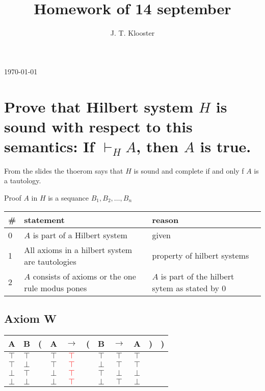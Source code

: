 \documentclass{article}
\begin{document}
\author{J. T. Klooster}
\title{Homework of 14 september}
\maketitle
\today
\section{Prove that Hilbert system $H$ is sound with respect to this
semantics: If $\vdash_H A$, then $A$ is true.}

From the slides the thoerom says that $H$ is sound and complete
if and only f $A$ is a tautology.

Proof $A$ in $H$ is a sequance $B_1, B_2, \ldots, B_n$

\begin{tabular}{@{}l|ll@{}}
\#& statement			&reason \\ \toprule
0& $A$ is part of a Hilbert system & given \\
1& All axioms in a hilbert system are tautologies & property of hilbert systems\\
2& $A$ consists of axioms or the one rule modus pones & $A$ is part of the hilbert sytem as stated by $0$ \\
\end{tabular}


\subsection{Axiom W}
\begin{tabular}{@{ }c@{ }@{ }c | c@{}@{ }c@{ }@{ }c@{ }@{}c@{}@{ }c@{ }@{ }c@{ }@{ }c@{ }@{}c@{}@{}c@{ }}
A & B & ( & A & $\rightarrow$ & ( & B & $\rightarrow$ & A & ) & )\\
\hline 
$\top$ & $\top$ &  & $\top$ & \textcolor{red}{$\top$} &  & $\top$ & $\top$ & $\top$ &  & \\
$\top$ & $\bot$ &  & $\top$ & \textcolor{red}{$\top$} &  & $\bot$ & $\top$ & $\top$ &  & \\
$\bot$ & $\top$ &  & $\bot$ & \textcolor{red}{$\top$} &  & $\top$ & $\bot$ & $\bot$ &  & \\
$\bot$ & $\bot$ &  & $\bot$ & \textcolor{red}{$\top$} &  & $\bot$ & $\top$ & $\bot$ &  & \\
\end{tabular}
\end{document}
